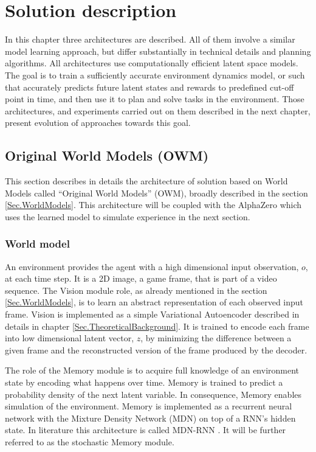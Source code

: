 \section{Solution description} \label{Sec.SolutionDescription}

In this chapter three architectures are described. All of them involve a similar model learning approach, but differ substantially in technical details and planning algorithms. All architectures use computationally efficient latent space models. The goal is to train a sufficiently accurate environment dynamics model, or such that accurately predicts future latent states and rewards to predefined cut-off point in time, and then use it to plan and solve tasks in the environment. Those architectures, and experiments carried out on them described in the next chapter, present evolution of approaches towards this goal.

\subsection{Original World Models (OWM)}

This section describes in details the architecture of solution based on World Models \cite{Algo.WorldModels} called ``Original World Models'' (OWM), broadly described in the section \ref{Sec.WorldModels}. This architecture will be coupled with the AlphaZero which uses the learned model to simulate experience in the next section.

\subsubsection{World model}

An environment provides the agent with a high dimensional input observation, $o$, at each time step. It is a 2D image, a game frame, that is part of a video sequence. The Vision module role, as already mentioned in the section \ref{Sec.WorldModels}, is to learn an abstract representation of each observed input frame. Vision is implemented as a simple Variational Autoencoder described in details in chapter \ref{Sec.TheoreticalBackground}. It is trained to encode each frame into low dimensional latent vector, $z$, by minimizing the difference between a given frame and the reconstructed version of the frame produced by the decoder.

The role of the Memory module is to acquire full knowledge of an environment state by encoding what happens over time. Memory is trained to predict a probability density of the next latent variable. In consequence, Memory enables simulation of the environment. Memory is implemented as a recurrent neural network with the Mixture Density Network (MDN) on top of a RNN's hidden state. In literature this architecture is called MDN-RNN \cite{Algo.MDNRNN}. It will be further referred to as the stochastic Memory module.

